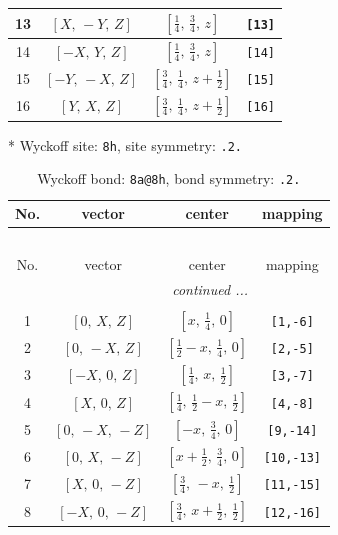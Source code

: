 \documentclass[fleqn,8pt]{jsarticle}
\begin{document}
\begin{longtable}{cccc}
13 & $\left[ X,\, - Y,\, Z \right]$ & $\left[ \frac{1}{4},\, \frac{3}{4},\, z \right]$ & {\tt [13]} \\ \hline
14 & $\left[ - X,\, Y,\, Z \right]$ & $\left[ \frac{1}{4},\, \frac{3}{4},\, z \right]$ & {\tt [14]} \\ \hline
15 & $\left[ - Y,\, - X,\, Z \right]$ & $\left[ \frac{3}{4},\, \frac{1}{4},\, z + \frac{1}{2} \right]$ & {\tt [15]} \\ \hline
16 & $\left[ Y,\, X,\, Z \right]$ & $\left[ \frac{3}{4},\, \frac{1}{4},\, z + \frac{1}{2} \right]$ & {\tt [16]} \\
\end{longtable}
* Wyckoff site: {\tt 8h}, site symmetry: {\tt .2.}
\renewcommand{\arraystretch}{1.2}
\begin{longtable}{cccc}
\caption{Wyckoff bond: {\tt 8a@8h}, bond symmetry: {\tt .2.}}
 \\
 \hline \hline
No. & vector & center & mapping \\ \hline \endfirsthead

\multicolumn{3}{l}{\tablename\ \thetable{}} \\
 \hline \hline
No. & vector & center & mapping \\ \hline \endhead

 \hline \hline
\multicolumn{3}{r}{\footnotesize\it continued ...} \\ \endfoot

 \hline \hline
\multicolumn{3}{r}{} \\ \endlastfoot

1 & $\left[ 0,\, X,\, Z \right]$ & $\left[ x,\, \frac{1}{4},\, 0 \right]$ & {\tt [1,-6]} \\ \hline
2 & $\left[ 0,\, - X,\, Z \right]$ & $\left[ \frac{1}{2} - x,\, \frac{1}{4},\, 0 \right]$ & {\tt [2,-5]} \\ \hline
3 & $\left[ - X,\, 0,\, Z \right]$ & $\left[ \frac{1}{4},\, x,\, \frac{1}{2} \right]$ & {\tt [3,-7]} \\ \hline
4 & $\left[ X,\, 0,\, Z \right]$ & $\left[ \frac{1}{4},\, \frac{1}{2} - x,\, \frac{1}{2} \right]$ & {\tt [4,-8]} \\ \hline
5 & $\left[ 0,\, - X,\, - Z \right]$ & $\left[ - x,\, \frac{3}{4},\, 0 \right]$ & {\tt [9,-14]} \\ \hline
6 & $\left[ 0,\, X,\, - Z \right]$ & $\left[ x + \frac{1}{2},\, \frac{3}{4},\, 0 \right]$ & {\tt [10,-13]} \\ \hline
7 & $\left[ X,\, 0,\, - Z \right]$ & $\left[ \frac{3}{4},\, - x,\, \frac{1}{2} \right]$ & {\tt [11,-15]} \\ \hline
8 & $\left[ - X,\, 0,\, - Z \right]$ & $\left[ \frac{3}{4},\, x + \frac{1}{2},\, \frac{1}{2} \right]$ & {\tt [12,-16]} \\
\end{longtable}
\end{document}
